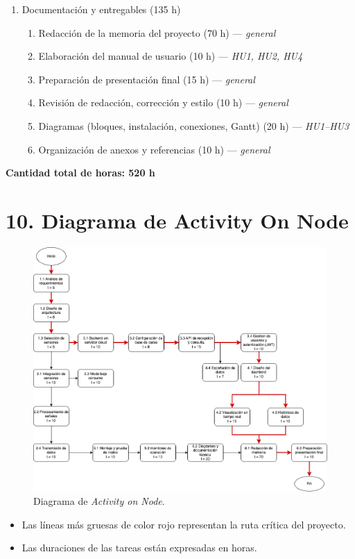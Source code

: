 \documentclass[
11pt, %
]{charter}
\begin{document}
\begin{enumerate}
    \item Documentación y entregables (135 h)
    \begin{enumerate}
        \item Redacción de la memoria del proyecto (70 h) — \textit{general}
        \item Elaboración del manual de usuario (10 h) — \textit{HU1, HU2, HU4}
        \item Preparación de presentación final (15 h) — \textit{general}
        \item Revisión de redacción, corrección y estilo (10 h) — \textit{general}
        \item Diagramas (bloques, instalación, conexiones, Gantt) (20 h) — \textit{HU1–HU3}
        \item Organización de anexos y referencias (10 h) — \textit{general}
    \end{enumerate}
\end{enumerate}

\textbf{Cantidad total de horas: 520 h}


\section{10. Diagrama de Activity On Node}
\label{sec:AoN}


\begin{figure}[htpb]
\centering 
\includegraphics[width=1.05\textwidth]{./Figuras/DiagramAON4.png}
\caption{Diagrama de \textit{Activity on Node}.}
\label{fig:AoN}
\end{figure}
\begin{itemize}
    \item Las líneas más gruesas de color rojo representan la ruta crítica del proyecto.
    \item Las duraciones de las tareas están expresadas en horas.
\end{itemize}
\end{document}
